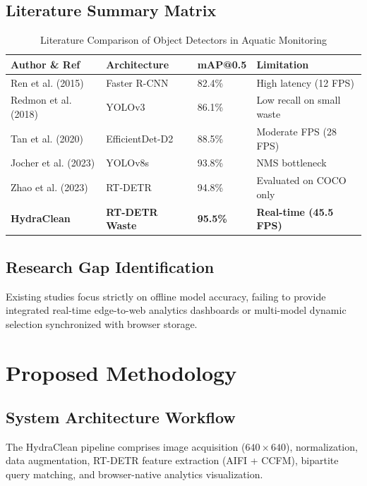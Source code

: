 \documentclass[10pt,journal,compsoc]{IEEEtran}
\begin{document}
\subsection{Literature Summary Matrix}
\begin{table}[htbp]
\caption{Literature Comparison of Object Detectors in Aquatic Monitoring}
\centering
\begin{tabular}{llll}
\toprule
\textbf{Author \& Ref} & \textbf{Architecture} & \textbf{mAP@0.5} & \textbf{Limitation} \\
\midrule
Ren et al. (2015) & Faster R-CNN & 82.4\% & High latency (12 FPS) \\
Redmon et al. (2018) & YOLOv3 & 86.1\% & Low recall on small waste \\
Tan et al. (2020) & EfficientDet-D2 & 88.5\% & Moderate FPS (28 FPS) \\
Jocher et al. (2023) & YOLOv8s & 93.8\% & NMS bottleneck \\
Zhao et al. (2023) & RT-DETR & 94.8\% & Evaluated on COCO only \\
\textbf{HydraClean} & \textbf{RT-DETR Waste} & \textbf{95.5\%} & \textbf{Real-time (45.5 FPS)} \\
\bottomrule
\end{tabular}
\end{table}

\subsection{Research Gap Identification}
Existing studies focus strictly on offline model accuracy, failing to provide integrated real-time edge-to-web analytics dashboards or multi-model dynamic selection synchronized with browser storage.

\section{Proposed Methodology}

\subsection{System Architecture Workflow}
The HydraClean pipeline comprises image acquisition ($640 \times 640$), normalization, data augmentation, RT-DETR feature extraction (AIFI + CCFM), bipartite query matching, and browser-native analytics visualization.
\end{document}
